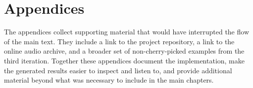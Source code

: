 \documentclass[a4paper, 12pt, openany]{book} %
\renewcommand{\headrulewidth}{0pt}%
\numberwithin{example}{section}
\begin{document}
\printbibliography[title={References}] %
\cleardoublepage

\chapter*{\LARGE \textbf{Appendices}}
\fancyhf{} %
\renewcommand{\headrulewidth}{0pt} %
The appendices collect supporting material that would have interrupted the flow of the main text. They include a link to the project repository, a link to the online audio archive, and a broader set of non-cherry-picked examples from the third iteration. Together these appendices document the implementation, make the generated results easier to inspect and listen to, and provide additional material beyond what was necessary to include in the main chapters.
\fancyfoot[C]{\thepage} %

\appendix

\end{document}
